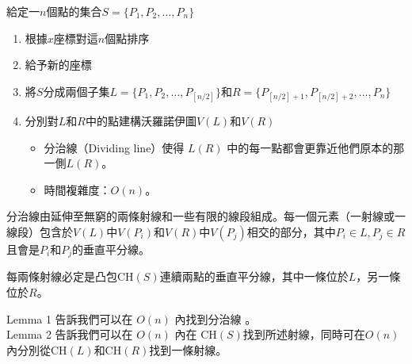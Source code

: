 \documentclass[15pt]{extarticle}
\begin{document}
給定一$n$個點的集合$S=\{P_1,P_2,\dots,P_n\}$
\begin{enumerate}
    \item 根據$x$座標對這$n$個點排序
    \item 給予新的座標
    \item 將$S$分成兩個子集$L=\{P_1,P_2,\dots,P_{[n/2]}\}$和$R=\{P_{[n/2]+1},P_{[n/2]+2},\dots,P_n\}$
    \item 分別對$L$和$R$中的點建構沃羅諾伊圖$V(L)$和$V(R)$
    \begin{itemize}
        \item 分治線（Dividing line）使得 $L(R)$ 中的每一點都會更靠近他們原本的那一側$L(R)$。
        \item 時間複雜度：$O(n)$。
    \end{itemize}
\end{enumerate}

\begin{lemma}
    分治線由延伸至無窮的兩條射線和一些有限的線段組成。每一個元素（一射線或一線段）包含於$V(L)$中$V(P_i)$和$V(R)$中$V(P_j)$相交的部分，其中$P_i\in L, P_j\in R$且會是$P_i$和$P_j$的垂直平分線。
\end{lemma}

\begin{lemma}
    每兩條射線必定是凸包CH$(S)$連續兩點的垂直平分線，其中一條位於$L$，另一條位於$R$。
\end{lemma}

Lemma 1 告訴我們可以在 $O(n)$ 內找到分治線 。\\

Lemma 2 告訴我們可以在 $O(n)$ 內在 CH$(S)$找到所述射線，同時可在$O(n)$內分別從CH$(L)$和CH$(R)$找到一條射線。
\end{document}
